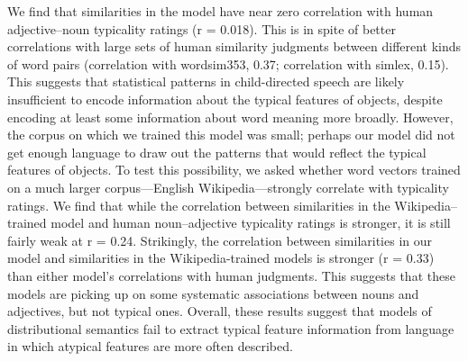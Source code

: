\documentclass[10pt, letterpaper]{article}
\begin{document}
We find that similarities in the model have near zero correlation with
human adjective--noun typicality ratings (r = 0.018). This is in spite
of better correlations with large sets of human similarity judgments
between different kinds of word pairs (correlation with wordsim353,
0.37; correlation with simlex, 0.15). This suggests that statistical
patterns in child-directed speech are likely insufficient to encode
information about the typical features of objects, despite encoding at
least some information about word meaning more broadly. However, the
corpus on which we trained this model was small; perhaps our model did
not get enough language to draw out the patterns that would reflect the
typical features of objects. To test this possibility, we asked whether
word vectors trained on a much larger corpus---English
Wikipedia---strongly correlate with typicality ratings. We find that
while the correlation between similarities in the Wikipedia--trained
model and human noun--adjective typicality ratings is stronger, it is
still fairly weak at r = 0.24. Strikingly, the correlation between
similarities in our model and similarities in the Wikipedia-trained
models is stronger (r = 0.33) than either model's correlations with
human judgments. This suggests that these models are picking up on some
systematic associations between nouns and adjectives, but not typical
ones. Overall, these results suggest that models of distributional
semantics fail to extract typical feature information from language in
which atypical features are more often described.
\end{document}
